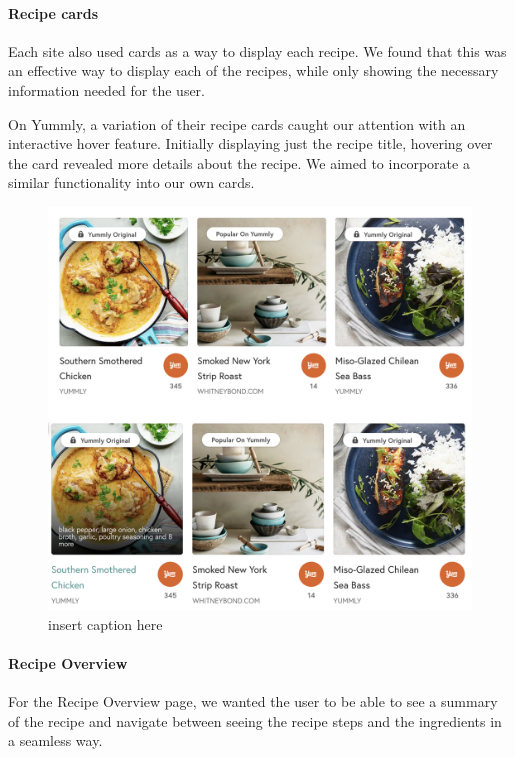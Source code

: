 \documentclass{article}
\begin{document}
    \paragraph{Recipe cards}
    Each site also used cards as a way to display each recipe. We found that this was an effective way to display each of the recipes, while only showing the necessary information needed for the user.
    
    On Yummly, a variation of their recipe cards caught our attention with an interactive hover feature. Initially displaying just the recipe title, hovering over the card revealed more details about the recipe. We aimed to incorporate a similar functionality into our own cards.
    
    \begin{figure}
      \includegraphics[width=1.0\textwidth]{Yummly recipe cards.png}
      \centering
      \caption{insert caption here}
    \end{figure}

    \paragraph{Recipe Overview}
    For the Recipe Overview page, we wanted the user to be able to see a summary of the recipe and navigate between seeing the recipe steps and the ingredients in a seamless way.
    
\end{document}
